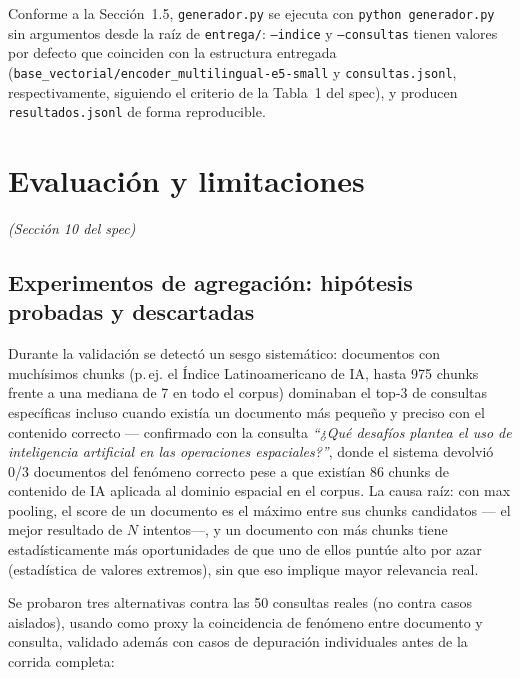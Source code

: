 \documentclass[11pt]{article}
\newcommand{\codigo}[1]{\texttt{\small #1}}
\newcommand{\seccionspec}[1]{\textit{(Sección #1 del spec)}}
\begin{document}
Conforme a la Sección~1.5, \codigo{generador.py} se ejecuta con
\codigo{python generador.py} sin argumentos desde la raíz de
\codigo{entrega/}: \codigo{--indice} y \codigo{--consultas} tienen valores
por defecto que coinciden con la estructura entregada
(\codigo{base\_vectorial/encoder\_multilingual-e5-small} y
\codigo{consultas.jsonl}, respectivamente, siguiendo el criterio de la
Tabla~1 del spec), y producen \codigo{resultados.jsonl} de forma
reproducible.

\section{Evaluación y limitaciones}
\label{sec:evaluacion}
\seccionspec{10}

\subsection{Experimentos de agregación: hipótesis probadas y descartadas}
\label{sec:agregacion}

Durante la validación se detectó un sesgo sistemático: documentos con
muchísimos chunks (p.\,ej. el Índice Latinoamericano de IA, hasta 975 chunks
frente a una mediana de 7 en todo el corpus) dominaban el top-3 de consultas
específicas incluso cuando existía un documento más pequeño y preciso con el
contenido correcto --- confirmado con la consulta \emph{``¿Qué desafíos
plantea el uso de inteligencia artificial en las operaciones espaciales?''},
donde el sistema devolvió 0/3 documentos del fenómeno correcto pese a que
existían 86 chunks de contenido de IA aplicada al dominio espacial en el
corpus. La causa raíz: con max pooling, el score de un documento es el
máximo entre sus chunks candidatos --- el mejor resultado de $N$ intentos---,
y un documento con más chunks tiene estadísticamente más oportunidades de
que uno de ellos puntúe alto por azar (estadística de valores extremos), sin
que eso implique mayor relevancia real.

Se probaron tres alternativas contra las 50 consultas reales (no contra
casos aislados), usando como proxy la coincidencia de fenómeno entre
documento y consulta, validado además con casos de depuración individuales
antes de la corrida completa:
\end{document}

